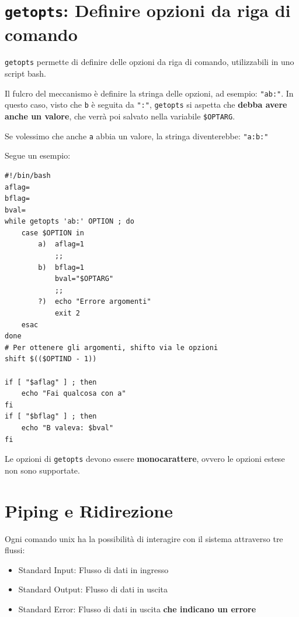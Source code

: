 \documentclass[a4paper]{report}
\newenvironment{ricordati}{\begin{tcolorbox}[fonttitle=\sffamily\bfseries\large,title=Ricordati,colframe=orange!75!white]}{\end{tcolorbox}}
\newenvironment{code}{\begin{tcolorbox}[size=small]}{\end{tcolorbox}}
\begin{document}
\section{\texttt{getopts}: Definire opzioni da riga di comando}

\texttt{getopts} permette di definire delle opzioni da riga di comando, utilizzabili in uno script bash. 

Il fulcro del meccanismo è definire la stringa delle opzioni, ad esempio: \texttt{"ab:"}. In questo caso, visto che \texttt{b} è seguita da \texttt{":"}, \texttt{getopts} si aspetta che \textbf{debba avere anche un valore}, che verrà poi salvato nella variabile \texttt{\$OPTARG}.

Se volessimo che anche \texttt{a} abbia un valore, la stringa diventerebbe: \texttt{"a:b:"}

Segue un esempio:

\begin{code}
\begin{lstlisting}
#!/bin/bash
aflag=
bflag=
bval=
while getopts 'ab:' OPTION ; do
	case $OPTION in
		a)	aflag=1
			;;
		b)	bflag=1
			bval="$OPTARG"
			;;
		?)	echo "Errore argomenti"
			exit 2
	esac
done
# Per ottenere gli argomenti, shifto via le opzioni
shift $(($OPTIND - 1))

if [ "$aflag" ] ; then
	echo "Fai qualcosa con a"
fi
if [ "$bflag" ]	; then
	echo "B valeva: $bval"
fi
\end{lstlisting}
\end{code}

\begin{ricordati}
	Le opzioni di \texttt{getopts} devono essere \textbf{monocarattere}, ovvero le opzioni estese non sono supportate.
\end{ricordati}

\section{Piping e Ridirezione}

Ogni comando unix ha la possibilità di interagire con il sistema attraverso tre flussi:
\begin{itemize}
	\item Standard Input: Flusso di dati in ingresso
	\item Standard Output: Flusso di dati in uscita
	\item Standard Error: Flusso di dati in uscita \textbf{che indicano un errore}
\end{itemize}
\end{document}
